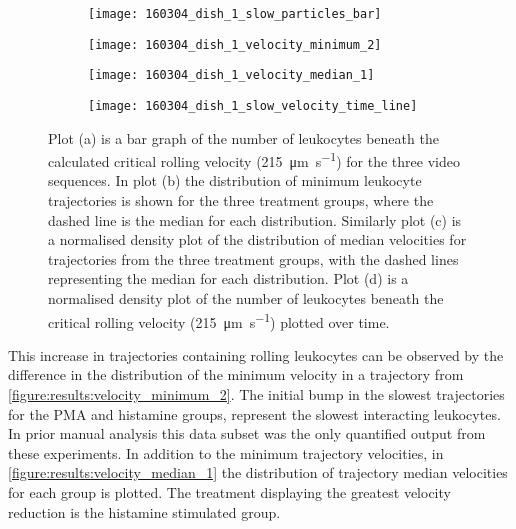 \begin{figure}[htbp]\centering
	\begin{subfigure}[b]{0.49\linewidth}
		\centering
		\texttt{[image: 160304\_dish\_1\_slow\_particles\_bar]}
		\caption{}
		\label{figure:results:slow_particles_bar}
		\vspace{1ex}
	\end{subfigure}
	\begin{subfigure}[b]{0.49\linewidth}
		\centering
		\texttt{[image: 160304\_dish\_1\_velocity\_minimum\_2]}
		\caption{}
		\label{figure:results:velocity_minimum_2}
		\vspace{1ex}
	\end{subfigure}
	\begin{subfigure}[b]{0.49\linewidth}
		\centering
		\texttt{[image: 160304\_dish\_1\_velocity\_median\_1]}
		\caption{}
		\label{figure:results:velocity_median_1}
		\vspace{1ex}
	\end{subfigure}
	\begin{subfigure}[b]{0.49\linewidth}
		\centering
		\texttt{[image: 160304\_dish\_1\_slow\_velocity\_time\_line]}
		\caption{}
		\label{figure:results:slow_velocity_time_line}
		\vspace{1ex}
	\end{subfigure}
\caption[Results of leukocyte analysis]{Plot (a) is a bar graph of the number of leukocytes beneath the calculated critical rolling velocity (\SI{215}{\micro\meter\per\second}) for the three video sequences. In plot (b) the distribution of minimum leukocyte trajectories is shown for the three treatment groups, where the dashed line is the median for each distribution. Similarly plot (c) is a normalised density plot of the distribution of median velocities for trajectories from the three treatment groups, with the dashed lines representing the median for each distribution. Plot (d) is a normalised density plot of the number of leukocytes beneath the critical rolling velocity (\SI{215}{\micro\meter\per\second}) plotted over time.}
\label{figure:results:min_velocity_histograms}
\end{figure}

This increase in trajectories containing rolling leukocytes can be observed by the difference in the distribution of the minimum velocity in a trajectory from \autoref{figure:results:velocity_minimum_2}. The initial bump in the slowest trajectories for the PMA and histamine groups, represent the slowest interacting leukocytes. In prior manual analysis this data subset was the only quantified output from these experiments. In addition to the minimum trajectory velocities, in \autoref{figure:results:velocity_median_1} the distribution of trajectory median velocities for each group is plotted. The treatment displaying the greatest velocity reduction is the histamine stimulated group.

